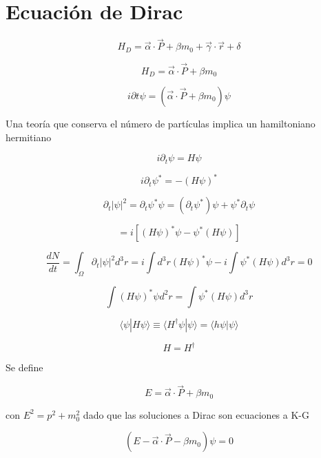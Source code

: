 \documentclass{report}
\begin{document}
\chapter{Ecuaci\'on de Dirac}


\begin{equation}
H_{D} = \overrightarrow{\alpha} \cdot \overrightarrow{P} + \beta m_{0}+ \overrightarrow{\gamma} \cdot \overrightarrow{r} + \delta
\end{equation}

\begin{equation}
H_{D} = \overrightarrow{\alpha} \cdot \overrightarrow{P} + \beta m_{0}
\end{equation}

\[i \partial t \psi = (\overrightarrow{\alpha} \cdot \overrightarrow{P} + \beta m_{0}) \psi\]

Una teoría que conserva el número de partículas implica un hamiltoniano hermitiano

\[i \partial _{t} \psi = H \psi\]

\[i \partial_{t} \psi^{*} = -(H \psi)^{*}\]

\[\partial _{t} |\psi|^2 = \partial_{t} \psi^{*} \psi = (\partial_{t}\psi^{*})\psi + \psi^{*}\partial_{t}\psi\]

\[= i [(H\psi)^{*}\psi - \psi^{*}(H\psi)]\]

\[\frac{dN}{d t} = \int_{\Omega} \partial _{t} |\psi|^2 d^3 r= i \int d^3 r (H \psi)^{*} \psi - i \int \psi^{*} (H \psi) d^3 r =0\]

\begin{equation}
\int (H\psi)^{*} \psi d^{2}r= \int \psi^{*}(H \psi) d^3 r
\end{equation}

\[\langle \psi | H \psi \rangle \equiv \langle H^{\dagger} \psi | \psi \rangle = \langle h \psi | \psi \rangle\]

\begin{equation}
H = H^{\dagger}
\end{equation}

Se define

\begin{equation}
E = \overrightarrow{\alpha} \cdot \overrightarrow{P} + \beta m_{0}
\end{equation}


con $E^{2} = p^{2} + m_{0}^2$ dado que las soluciones a Dirac son ecuaciones a K-G

\begin{equation}
(E-\overrightarrow{\alpha} \cdot \overrightarrow{P} - \beta m_{0}) \psi = 0
\end{equation}
\end{document}
